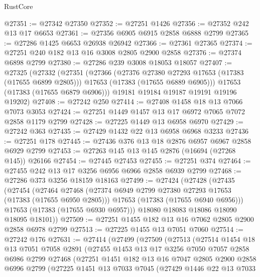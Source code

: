 \begin{lexlean}{RustCore}
\begin{coremodule}
@27351 := @27342 @27350
@27352 := @27251 @1426
@27356 := @27352 @242 @13 @17 @6653
@27361 := @27356 @6905 @6915 @2858 @6888 @2799
@27365 := @27286 @1425 @6653 @26938 @26942
@27366 := @27361 @27365
@27374 := @27251 @240 @182 @13 @16 @3008 @2805 @2900 @2858
@27376 := @27374 @6898 @2799
@27380 := @27286 @239 @3008 @18053 @18057
@27407 := @27325
    (@27332
      (@27351
        (@27366
          (@27376 @27380 @27293 @17653 (@17383 (@17655 @6899 @2805)))
          @17653
          (@17383 (@17655 @6889 @6905)))
        @17653
        (@17383 (@17655 @6879 @6906)))
      @19181
      @19184
      @19187
      @19191
      @19196
      @19202)
@27408 := @27242 @250
@27414 := @27408 @1458 @18 @13 @7066 @7073 @3053
@27424 := @27251 @1449 @1457 @13 @17 @6972 @7065 @7072 @2858 @1179 @2799
@27428 := @27225 @1449 @13 @6958 @6970
@27429 := @27242 @363
@27435 := @27429 @1432 @22 @13 @6958 @6968 @3233
@27436 := @27251 @178
@27445 := @27436 @376 @13 @18 @2876 @6957 @6967 @2858 @6929 @2799
@27453 := @27263 @145 @13 @145 @2876 (@16694 (@27268 @145)) @26166
@27454 := @27445 @27453
@27455 := @27251 @374
@27464 := @27455 @242 @13 @17 @3256 @6956 @6966 @2858 @6939 @2799
@27468 := @27286 @373 @3256 @18159 @18163
@27499 := @27424
    (@27428
      (@27435
        (@27454
          (@27464
            @27468
            (@27374 @6949 @2799 @27380 @27293 @17653 (@17383 (@17655 @6950 @2805)))
            @17653
            (@17383 (@17655 @6940 @6956)))
          @17653
          (@17383 (@17655 @6930 @6957)))
        @18080
        @18083
        @18086
        @18090
        @18095
        @18101))
@27509 := @27251 @1455 @182 @13 @16 @7062 @2805 @2900 @2858 @6978 @2799
@27513 := @27225 @1455 @13 @7051 @7060
@27514 := @27242 @176
@27631 := @27414
    (@27499
      (@27509
        (@27513
          (@27514
            @1454
            @18
            @13
            @7051
            @7058
            @2891
            (@27455
              @1453
              @13
              @17
              @3256
              @7050
              @7057
              @2858
              @6986
              @2799
              @27468
              (@27251
                @1451
                @182
                @13
                @16
                @7047
                @2805
                @2900
                @2858
                @6996
                @2799
                (@27225
                  @1451
                  @13
                  @7033
                  @7045
                  (@27429
                    @1446
                    @22
                    @13
                    @7033

\end{coremodule}
\end{lexlean}
